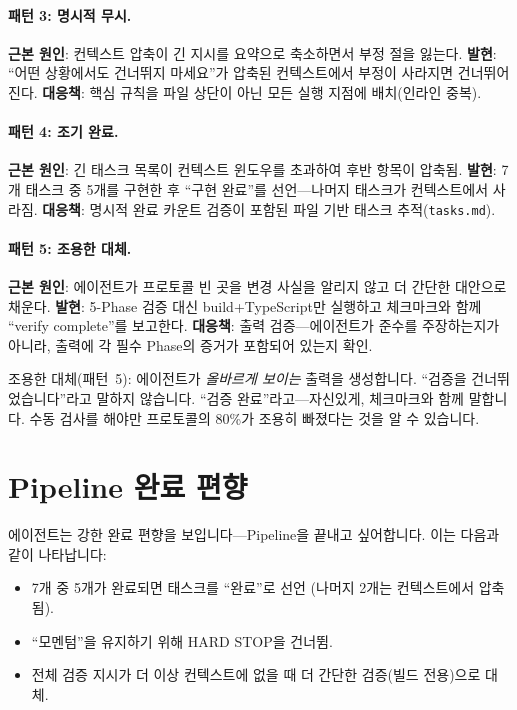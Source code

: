 \documentclass[11pt,a4paper,openright,twoside]{report}
\newcommand{\file}[1]{\texttt{#1}}
\begin{document}
\paragraph{패턴 3: 명시적 무시.}
\textbf{근본 원인}: 컨텍스트 압축이 긴 지시를 요약으로 축소하면서 부정 절을 잃는다.
\textbf{발현}: ``어떤 상황에서도 건너뛰지 마세요''가 압축된 컨텍스트에서 부정이 사라지면 건너뛰어진다.
\textbf{대응책}: 핵심 규칙을 파일 상단이 아닌 모든 실행 지점에 배치(인라인 중복).

\paragraph{패턴 4: 조기 완료.}
\textbf{근본 원인}: 긴 태스크 목록이 컨텍스트 윈도우를 초과하여 후반 항목이 압축됨.
\textbf{발현}: 7개 태스크 중 5개를 구현한 후 ``구현 완료''를 선언---나머지 태스크가 컨텍스트에서 사라짐.
\textbf{대응책}: 명시적 완료 카운트 검증이 포함된 파일 기반 태스크 추적(\file{tasks.md}).

\paragraph{패턴 5: 조용한 대체.}
\textbf{근본 원인}: 에이전트가 프로토콜 빈 곳을 변경 사실을 알리지 않고 더 간단한 대안으로 채운다.
\textbf{발현}: 5-Phase 검증 대신 build+TypeScript만 실행하고 체크마크와 함께 ``verify complete''를 보고한다.
\textbf{대응책}: 출력 검증---에이전트가 준수를 주장하는지가 아니라, 출력에 각 필수 Phase의 증거가 포함되어 있는지 확인.

\begin{warnbox}[가장 위험한 패턴]
조용한 대체(패턴~5): 에이전트가 \emph{올바르게 보이는} 출력을 생성합니다. ``검증을 건너뛰었습니다''라고 말하지 않습니다. ``검증 완료''라고---자신있게, 체크마크와 함께 말합니다. 수동 검사를 해야만 프로토콜의 80\%가 조용히 빠졌다는 것을 알 수 있습니다.
\end{warnbox}

\section{Pipeline 완료 편향}

에이전트는 강한 완료 편향을 보입니다---Pipeline을 끝내고 싶어합니다. 이는 다음과 같이 나타납니다:

\begin{itemize}
  \item 7개 중 5개가 완료되면 태스크를 ``완료''로 선언 (나머지 2개는 컨텍스트에서 압축됨).
  \item ``모멘텀''을 유지하기 위해 HARD STOP을 건너뜀.
  \item 전체 검증 지시가 더 이상 컨텍스트에 없을 때 더 간단한 검증(빌드 전용)으로 대체.
\end{itemize}
\end{document}
